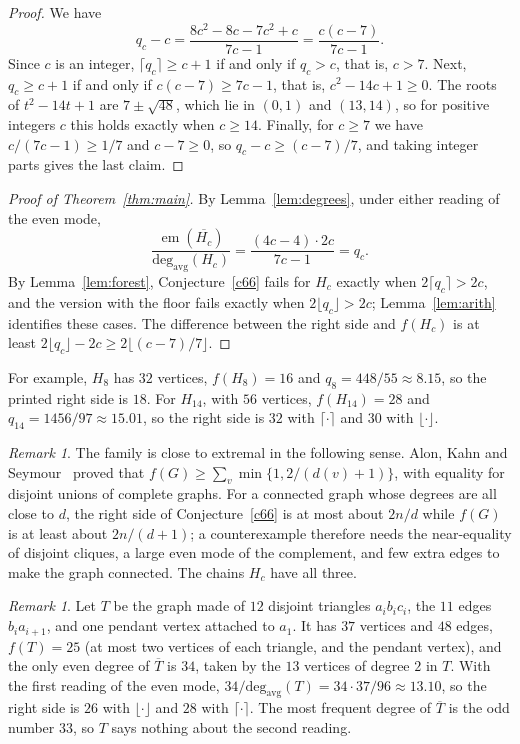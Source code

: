 \documentclass[11pt]{amsart}
\theoremstyle{definition}
\theoremstyle{remark}
\newtheorem{remark}[theorem]{Remark}
\numberwithin{equation}{section}
\newcommand{\davg}{\operatorname{deg_{avg}}}
\newcommand{\emo}{\operatorname{em}}
\begin{document}
\begin{proof}
We have
\[
q_c-c=\frac{8c^2-8c-7c^2+c}{7c-1}=\frac{c(c-7)}{7c-1}.
\]
Since $c$ is an integer, $\lceil q_c\rceil\ge c+1$ if and only if $q_c>c$, that is, $c>7$. Next, $q_c\ge c+1$ if and only if $c(c-7)\ge 7c-1$, that is, $c^2-14c+1\ge0$. The roots of $t^2-14t+1$ are $7\pm\sqrt{48}$, which lie in $(0,1)$ and $(13,14)$, so for positive integers $c$ this holds exactly when $c\ge14$. Finally, for $c\ge7$ we have $c/(7c-1)\ge1/7$ and $c-7\ge0$, so $q_c-c\ge(c-7)/7$, and taking integer parts gives the last claim.
\end{proof}

\begin{proof}[Proof of Theorem~\ref{thm:main}]
By Lemma~\ref{lem:degrees}, under either reading of the even mode,
\[
\frac{\emo(\overline{H_c})}{\davg(H_c)}=\frac{(4c-4)\cdot 2c}{7c-1}=q_c .
\]
By Lemma~\ref{lem:forest}, Conjecture~\ref{c66} fails for $H_c$ exactly when $2\lceil q_c\rceil>2c$, and the version with the floor fails exactly when $2\lfloor q_c\rfloor>2c$; Lemma~\ref{lem:arith} identifies these cases. The difference between the right side and $f(H_c)$ is at least $2\lfloor q_c\rfloor-2c\ge2\lfloor(c-7)/7\rfloor$.
\end{proof}

For example, $H_8$ has $32$ vertices, $f(H_8)=16$ and $q_8=448/55\approx8.15$, so the printed right side is $18$. For $H_{14}$, with $56$ vertices, $f(H_{14})=28$ and $q_{14}=1456/97\approx15.01$, so the right side is $32$ with $\lceil\cdot\rceil$ and $30$ with $\lfloor\cdot\rfloor$.

\begin{remark}
The family is close to extremal in the following sense. Alon, Kahn and Seymour~\cite{AKS1987} proved that $f(G)\ge\sum_v\min\{1,2/(d(v)+1)\}$, with equality for disjoint unions of complete graphs. For a connected graph whose degrees are all close to $d$, the right side of Conjecture~\ref{c66} is at most about $2n/d$ while $f(G)$ is at least about $2n/(d+1)$; a counterexample therefore needs the near-equality of disjoint cliques, a large even mode of the complement, and few extra edges to make the graph connected. The chains $H_c$ have all three.
\end{remark}

\begin{remark}\label{rem:37}
Let $T$ be the graph made of $12$ disjoint triangles $a_ib_ic_i$, the $11$ edges $b_ia_{i+1}$, and one pendant vertex attached to $a_1$. It has $37$ vertices and $48$ edges, $f(T)=25$ (at most two vertices of each triangle, and the pendant vertex), and the only even degree of $\overline T$ is $34$, taken by the $13$ vertices of degree $2$ in $T$. With the first reading of the even mode, $34/\davg(T)=34\cdot37/96\approx13.10$, so the right side is $26$ with $\lfloor\cdot\rfloor$ and $28$ with $\lceil\cdot\rceil$. The most frequent degree of $\overline T$ is the odd number $33$, so $T$ says nothing about the second reading.
\end{remark}
\end{document}
